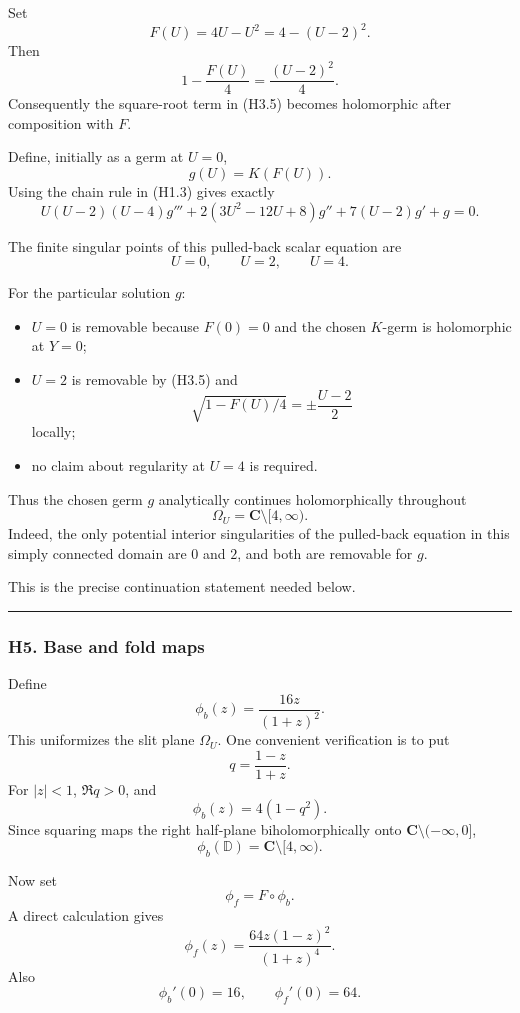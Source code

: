 \documentclass[
  10pt,
  letterpaper,
]{article}
\providecommand{\tightlist}{%
  \setlength{\itemsep}{0pt}\setlength{\parskip}{0pt}}
\theoremstyle{definition}
\theoremstyle{remark}
\begin{document}
Set \[
\boxed{
F(U)=4U-U^2=4-(U-2)^2.
}
\] Then \[
1-\frac{F(U)}4
=
\frac{(U-2)^2}{4}.
\] Consequently the square-root term in (H3.5) becomes holomorphic after
composition with \(F\).

Define, initially as a germ at \(U=0\), \[
g(U)=K(F(U)).
\] Using the chain rule in (H1.3) gives exactly \[
\boxed{
U(U-2)(U-4)g'''
+
2(3U^2-12U+8)g''
+
7(U-2)g'
+
g
=0.
}
\tag{H4.1}
\]

The finite singular points of this pulled-back scalar equation are \[
U=0,\qquad U=2,\qquad U=4.
\]

For the particular solution \(g\):

\begin{itemize}
\tightlist
\item
  \(U=0\) is removable because \(F(0)=0\) and the chosen \(K\)-germ is
  holomorphic at \(Y=0\);
\item
  \(U=2\) is removable by (H3.5) and \[
  \sqrt{1-F(U)/4}=\pm\frac{U-2}{2}
  \] locally;
\item
  no claim about regularity at \(U=4\) is required.
\end{itemize}

Thus the chosen germ \(g\) analytically continues holomorphically
throughout \[
\boxed{
\Omega_U=\mathbf C\setminus[4,\infty).
}
\tag{H4.2}
\] Indeed, the only potential interior singularities of the pulled-back
equation in this simply connected domain are \(0\) and \(2\), and both
are removable for \(g\).

This is the precise continuation statement needed below.

\begin{center}\rule{0.5\linewidth}{0.5pt}\end{center}

\subsubsection{H5. Base and fold maps}\label{h5.-base-and-fold-maps}

Define \[
\boxed{
\phi_b(z)=\frac{16z}{(1+z)^2}.
}
\] This uniformizes the slit plane \(\Omega_U\). One convenient
verification is to put \[
q=\frac{1-z}{1+z}.
\] For \(|z|<1\), \(\Re q>0\), and \[
\phi_b(z)=4(1-q^2).
\] Since squaring maps the right half-plane biholomorphically onto
\(\mathbf C\setminus(-\infty,0]\), \[
\boxed{
\phi_b(\mathbb D)=\mathbf C\setminus[4,\infty).
}
\tag{H5.1}
\]

Now set \[
\phi_f=F\circ\phi_b.
\] A direct calculation gives \[
\boxed{
\phi_f(z)
=
\frac{64z(1-z)^2}{(1+z)^4}.
}
\tag{H5.2}
\] Also \[
\boxed{
\phi_b'(0)=16,
\qquad
\phi_f'(0)=64.
}
\tag{H5.3}
\]
\end{document}
